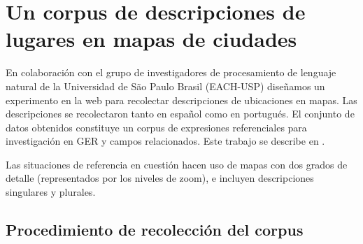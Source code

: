 \section{Un corpus de descripciones de lugares en mapas de ciudades}


En colaboraci\'on con el grupo de investigadores de procesamiento de lenguaje natural de la Universidad de S\~ao Paulo Brasil (EACH-USP) dise\~namos un experimento en la web para recolectar descripciones de ubicaciones en mapas. Las descripciones se recolectaron tanto en espa\~nol como en portugu\'es. El conjunto de datos obtenidos constituye un corpus de expresiones referenciales para investigaci\'on en GER y campos relacionados. Este trabajo se describe en \cite{DBLP:conf/acl/AltamiranoFPB15}.

Las situaciones de referencia en cuesti\'on hacen uso de mapas con dos grados de detalle (representados por los niveles de zoom), e incluyen descripciones singulares y plurales.



\subsection{Procedimiento de recolecci\'on del corpus}
\label{corpus-voluntarios}

